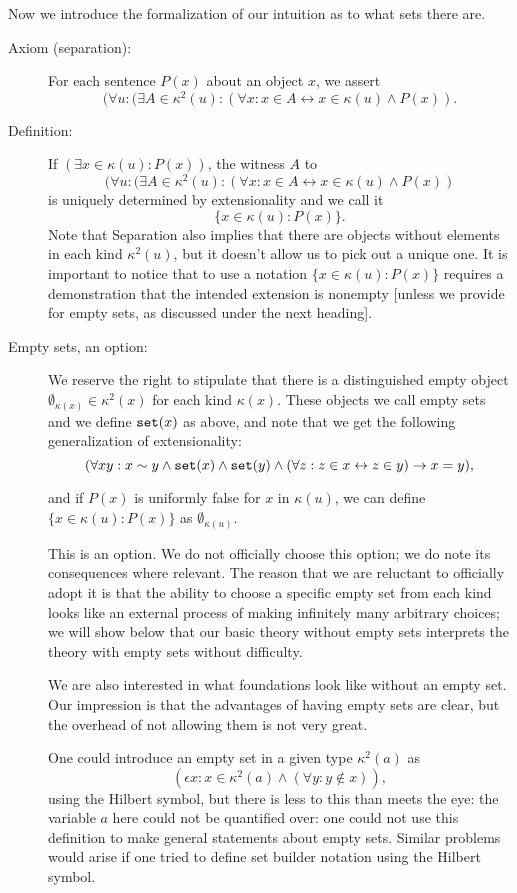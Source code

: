 \documentclass[12pt]{article}
\begin{document}
Now we introduce the formalization of our intuition as to what sets there are.

\begin{description}
\item[Axiom (separation):]   For each sentence $P(x)$ about an object $x$, we assert $$(\forall u:(\exists A \in \kappa^2(u):(\forall x:x\in A \leftrightarrow x \in \kappa(u) \wedge P(x)).$$


\item[Definition:]  If $(\exists x \in \kappa(u):P(x))$, the witness $A$ to $$(\forall u:(\exists A \in \kappa^2(u):(\forall x:x\in A \leftrightarrow x \in \kappa(u) \wedge P(x))$$ is uniquely determined by extensionality and we call it $$\{x \in \kappa(u):P(x)\}.$$  Note that Separation also implies that there are objects without elements in each kind $\kappa^2(u)$, but it doesn't allow us to pick out a unique one.  It is important to notice that to use a notation $\{x \in \kappa(u):P(x)\}$ requires a demonstration that the intended extension is nonempty [unless we provide for empty sets, as discussed under the next heading].

\item[Empty sets, an option:]  We reserve the right to stipulate that there is a distinguished empty object $\emptyset_{\kappa(x)} \in \kappa^2(x)$ for each kind $\kappa(x)$.  These objects we call empty sets and we define ${\tt set}(x)$ as above, and note that we get the following generalization of extensionality: $$(\forall xy: x\sim y \wedge {\tt set}(x) \wedge {\tt set}(y) \wedge(\forall z:z \in x \leftrightarrow z \in y) \rightarrow x=y),$$

and if $P(x)$ is uniformly false for $x$ in $\kappa(u)$, we can define \newline$\{x \in \kappa(u):P(x)\}$ as $\emptyset_{\kappa(u)}$.

This is an option.  We do not officially choose this option;  we do note its consequences where relevant.  The reason that we are reluctant to officially adopt it is that the ability to choose a specific empty set from each kind looks like an external process of making infinitely many arbitrary choices;  we will show below that our basic theory without empty sets interprets the theory with empty sets without difficulty.

We are also interested in what foundations look like without an empty set.  Our impression is that the advantages of having empty sets are clear, but the overhead of not allowing them is not very great.

One could introduce an empty set in a given type $\kappa^2(a)$ as $$(\epsilon x:x \in \kappa^2(a) \wedge (\forall y:y \not\in x)),$$  using the Hilbert symbol, but there is less to this than meets the eye:  the variable $a$ here could not be quantified over:  one could not use this definition to make general statements about empty sets.  Similar problems would arise if one tried to define set builder notation using the Hilbert symbol.

\end{description}
\end{document}
